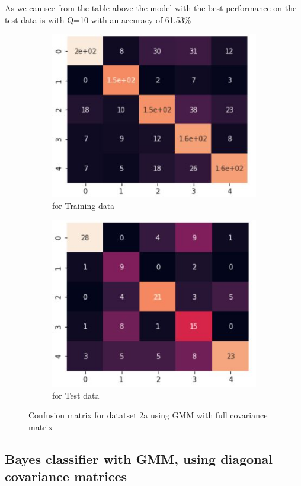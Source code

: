 \documentclass[11pt]{article}
\begin{document}
As we can see from the table above the model with the best performance on the test data is with  Q=10 with an accuracy of 61.53\% 

\begin{figure}[h]
\centering
	\begin{subfigure}[b]{0.45\textwidth}
	\centering
	\includegraphics[scale=0.6]{dataset2a_gmm_full_hm_train.jpg}
	\caption{for Training data}
	\label{fig:fig2.2.3.1}
	\end{subfigure}
	\hfill
	\begin{subfigure}[b]{0.45\textwidth}
	\centering
	\includegraphics[scale=0.6]{dataset2a_gmm_full_hm_test.jpg}
	\caption{for Test data}
	\label{fig:fig2.2.3.2}
	\end{subfigure}
\caption{Confusion matrix for datatset 2a using GMM with full covariance matrix}
\label{fig:fig1.2.1}
\end{figure}

\newpage
\subsection{Bayes classifier with GMM, using diagonal covariance matrices}
\end{document}

